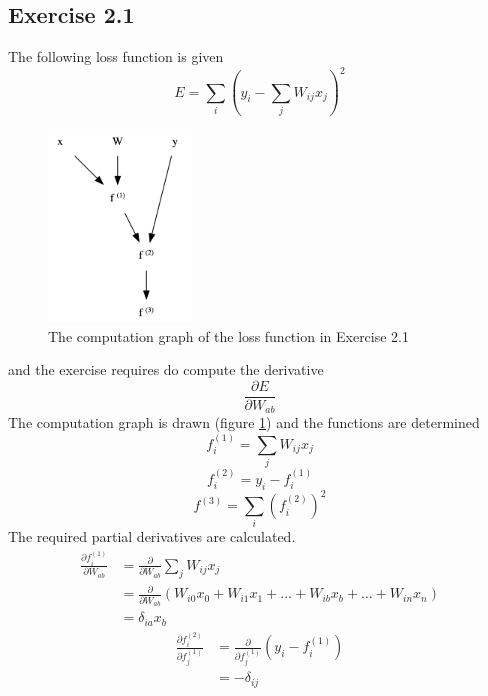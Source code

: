 \documentclass[fleqn]{article}
\begin{document}
\subsection*{Exercise 2.1}
The following loss function is given
\begin{equation}
    E = \sum_i \left( y_i - \sum_j W_{ij} x_j \right )^2
\end{equation}
\begin{figure}[H]
    \centering
    \includegraphics[height=2in]{cg21.png}
    \caption{The computation graph of the loss function in Exercise 2.1}
    \label{fig:cg21}
\end{figure}
and the exercise requires do compute the derivative
\begin{equation}
    \frac{\partial E}{\partial W_{ab}}
\end{equation}
The computation graph is drawn (figure \ref{fig:cg21}) and the functions are determined
\begin{equation}
    f^{(1)}_i = \sum_j W_{ij} x_j
\end{equation}
\begin{equation}
    f^{(2)}_i = y_i - f^{(1)}_i
\end{equation}
\begin{equation}
    f^{(3)} = \sum_i \left( f^{(2)}_i \right )^2
\end{equation}
The required partial derivatives are calculated.
\begin{equation}
    \begin{split}
        \frac{\partial f^{(1)}_i}{\partial W_{ab}} & =
        \frac{\partial}{\partial W_{ab}} \sum_j W_{ij} x_j \\
        & = \frac{\partial}{\partial W_{ab}} \left ( W_{i0} x_0 + W_{i1} x_1 + \dots + W_{ib} x_b + \dots + W_{in} x_n \right ) \\
        & = \delta_{ia} x_b
    \end{split}
\end{equation}
\begin{equation}
    \begin{split}
        \frac{\partial f^{(2)}_i}{\partial f^{(1)}_j} & =
        \frac{\partial}{\partial f^{(1)}_j}\left ( y_i - f^{(1)}_i \right )\\
        & = - \delta_{ij}
    \end{split}
\end{equation}
\end{document}
